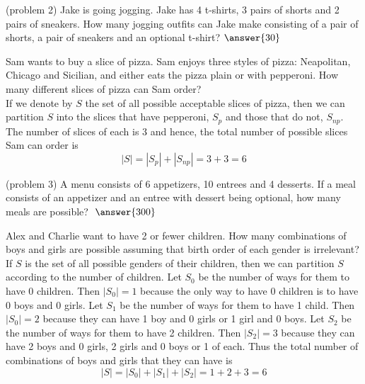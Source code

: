 \documentclass[handout]{ximera}
\begin{document}
\begin{problem}(problem 2)
Jake is going jogging.  Jake has 4 t-shirts, 3 pairs of shorts and 2 pairs of sneakers.
How many jogging outfits can Jake make consisting of a pair of shorts, a pair of sneakers and an optional t-shirt? \; $\answer{30}$
\end{problem}


\begin{example}[example 3]
Sam wants to buy a slice of pizza.  
Sam enjoys three styles of pizza: Neapolitan, Chicago and Sicilian, 
and either eats the pizza plain or with pepperoni.  
How many different slices of pizza can Sam order?\\
If we denote by $S$ the set of all possible acceptable slices of pizza, 
then we can partition $S$ into the slices that have pepperoni, $S_p$ and 
those that do not, $S_{np}$. The number of slices of each is 3 and 
hence, the total number of possible slices Sam can order is
\[
|S| = |S_p| + |S_{np}| = 3+3 =6
\]
\end{example}

\begin{problem}(problem 3)
A menu consists of 6 appetizers, 10 entrees and 4 desserts. 
If a meal consists of an appetizer and an entree with dessert being 
optional, how many meals are possible?
$\; \answer{300}$
\end{problem}




\begin{example}[example 4]
Alex and Charlie want to have 2 or fewer children.  
How many combinations of boys and girls are possible assuming 
that birth order of each gender is irrelevant?\\

If $S$ is the set of all possible genders of their children, then we can partition $S$ according to the number of children. Let $S_0$ be the number of ways for them to have 0 children. Then $|S_0| = 1$ because the only way to have 0 children is to have 0 boys and 0 girls. Let $S_1$ be the number of ways for them to have 1 child. Then $|S_0| = 2$ because they can have 1 boy and 0 girls or 1 girl and 0 boys.
 Let $S_2$ be the number of ways for them to have 2 children. Then $|S_2| = 3$ because they
 can have 2 boys and 0 girls, 2 girls and 0 boys or 1 of each.
 Thus the total number of combinations of boys and girls that they can have is
 \[
 |S| = |S_0|+|S_1|+|S_2|= 1 + 2+3 = 6
 \]
 \end{example}
 
\end{document}
